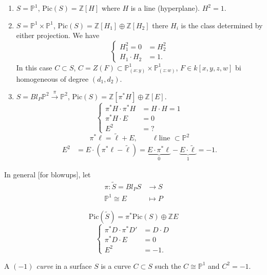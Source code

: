\begin{example}
\label{example-intersection}
\begin{enumerate}
\item $S=\mathbb{P}^1$,
$\text{Pic}(S)=\mathbb{Z}[H]$ where
$H$ is a line (hyperplane).
$H^2=1$.

\item $S=\mathbb{P}^1 \times \mathbb{P}^1$,
$\text{Pic}(S)=\mathbb{Z}[H_1] \oplus
\mathbb{Z}[H_2]$
there $H_i$ is the class determined by either
projection.
We have
$$
\begin{cases}
H_1^2=0&=H^2_2 \\
H_1\cdot H_2 &= 1.
\end{cases}
$$
In this case $C \subset S$, $C=Z(F)\subset
\mathbb{P}^1_{(x:y)}
\times \mathbb{P}^1_{(z:w)}$,
$F \in k[x,y,z,w]$
bi homogeneous of degree $(d_1,d_2)$.

\item $S=Bl_P\mathbb{P}^2
\xrightarrow{\pi}\mathbb{P}^2 $,
$\text{Pic}(S)=\mathbb{Z}[\pi^*H]
\oplus\mathbb{Z}[E]$.
$$
\begin{cases}
\pi^*H \cdot \pi^*H&=H\cdot H=1\\
\pi^*H\cdot E&=0\\
E^2&=?
\end{cases}
$$
$$
\pi^* \ell=\tilde{\ell}+E,\qquad  \ell \text{
line }\subset \mathbb{P}^2
$$
$$
\begin{aligned}
E^2&=E\cdot(\pi^* \ell - \tilde{\ell})
=\underbrace{E\cdot \pi^*\ell}_{0}
-\underbrace{E\cdot \tilde{\ell}}_{1}=-1.
\end{aligned}
$$
\end{enumerate}
\end{example}

\noindent
In general [for blowups],
let
$$
\begin{aligned}
\pi:\tilde{S}=Bl_PS&\longrightarrow S \\
\mathbb{P}^1 \cong E &\longmapsto P
\end{aligned}
$$

$$
\text{Pic}(\tilde{S})=\pi^*\text{Pic}(S)
\oplus \mathbb{Z}E
$$
$$
\begin{cases}
\pi^*D\cdot\pi^*D'&=D\cdot D \\
\pi^*D\cdot E&=0\\
E^2&=-1.
\end{cases}
$$
\begin{definition}
\label{definition-minus1-curve}
A {\it $(-1)$ curve} in a surface $S$ is a
curve $C \subset S$
such the $C \cong \mathbb{P}^1$ and $C^2=-1.$
\end{definition}

